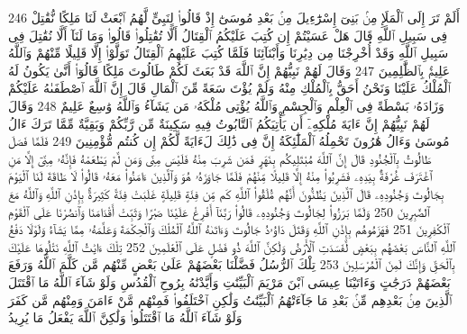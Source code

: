 {\tiny\colorbox{cl_aya}{246}} أَلَمْ تَرَ إِلَى ٱلْمَلَإِ مِنۢ بَنِىٓ إِسْرَٰٓءِيلَ مِنۢ بَعْدِ مُوسَىٰٓ إِذْ قَالُوا۟ لِنَبِىٍّ لَّهُمُ ٱبْعَثْ لَنَا مَلِكًا نُّقَٰتِلْ فِى سَبِيلِ ٱللَّهِ قَالَ هَلْ عَسَيْتُمْ إِن كُتِبَ عَلَيْكُمُ ٱلْقِتَالُ أَلَّا تُقَٰتِلُوا۟ قَالُوا۟ وَمَا لَنَآ أَلَّا نُقَٰتِلَ فِى سَبِيلِ ٱللَّهِ وَقَدْ أُخْرِجْنَا مِن دِيَٰرِنَا وَأَبْنَآئِنَا فَلَمَّا كُتِبَ عَلَيْهِمُ ٱلْقِتَالُ تَوَلَّوْا۟ إِلَّا قَلِيلًا مِّنْهُمْ وَٱللَّهُ عَلِيمٌۢ بِٱلظَّٰلِمِينَ
{\tiny\colorbox{cl_aya}{247}} وَقَالَ لَهُمْ نَبِيُّهُمْ إِنَّ ٱللَّهَ قَدْ بَعَثَ لَكُمْ طَالُوتَ مَلِكًا قَالُوٓا۟ أَنَّىٰ يَكُونُ لَهُ ٱلْمُلْكُ عَلَيْنَا وَنَحْنُ أَحَقُّ بِٱلْمُلْكِ مِنْهُ وَلَمْ يُؤْتَ سَعَةً مِّنَ ٱلْمَالِ قَالَ إِنَّ ٱللَّهَ ٱصْطَفَىٰهُ عَلَيْكُمْ وَزَادَهُۥ بَسْطَةً فِى ٱلْعِلْمِ وَٱلْجِسْمِ وَٱللَّهُ يُؤْتِى مُلْكَهُۥ مَن يَشَآءُ وَٱللَّهُ وَٰسِعٌ عَلِيمٌ
{\tiny\colorbox{cl_aya}{248}} وَقَالَ لَهُمْ نَبِيُّهُمْ إِنَّ ءَايَةَ مُلْكِهِۦٓ أَن يَأْتِيَكُمُ ٱلتَّابُوتُ فِيهِ سَكِينَةٌ مِّن رَّبِّكُمْ وَبَقِيَّةٌ مِّمَّا تَرَكَ ءَالُ مُوسَىٰ وَءَالُ هَٰرُونَ تَحْمِلُهُ ٱلْمَلَٰٓئِكَةُ إِنَّ فِى ذَٰلِكَ لَءَايَةً لَّكُمْ إِن كُنتُم مُّؤْمِنِينَ
{\tiny\colorbox{cl_aya}{249}} فَلَمَّا فَصَلَ طَالُوتُ بِٱلْجُنُودِ قَالَ إِنَّ ٱللَّهَ مُبْتَلِيكُم بِنَهَرٍ فَمَن شَرِبَ مِنْهُ فَلَيْسَ مِنِّى وَمَن لَّمْ يَطْعَمْهُ فَإِنَّهُۥ مِنِّىٓ إِلَّا مَنِ ٱغْتَرَفَ غُرْفَةًۢ بِيَدِهِۦ فَشَرِبُوا۟ مِنْهُ إِلَّا قَلِيلًا مِّنْهُمْ فَلَمَّا جَاوَزَهُۥ هُوَ وَٱلَّذِينَ ءَامَنُوا۟ مَعَهُۥ قَالُوا۟ لَا طَاقَةَ لَنَا ٱلْيَوْمَ بِجَالُوتَ وَجُنُودِهِۦ قَالَ ٱلَّذِينَ يَظُنُّونَ أَنَّهُم مُّلَٰقُوا۟ ٱللَّهِ كَم مِّن فِئَةٍ قَلِيلَةٍ غَلَبَتْ فِئَةً كَثِيرَةًۢ بِإِذْنِ ٱللَّهِ وَٱللَّهُ مَعَ ٱلصَّٰبِرِينَ
{\tiny\colorbox{cl_aya}{250}} وَلَمَّا بَرَزُوا۟ لِجَالُوتَ وَجُنُودِهِۦ قَالُوا۟ رَبَّنَآ أَفْرِغْ عَلَيْنَا صَبْرًا وَثَبِّتْ أَقْدَامَنَا وَٱنصُرْنَا عَلَى ٱلْقَوْمِ ٱلْكَٰفِرِينَ
{\tiny\colorbox{cl_aya}{251}} فَهَزَمُوهُم بِإِذْنِ ٱللَّهِ وَقَتَلَ دَاوُۥدُ جَالُوتَ وَءَاتَىٰهُ ٱللَّهُ ٱلْمُلْكَ وَٱلْحِكْمَةَ وَعَلَّمَهُۥ مِمَّا يَشَآءُ وَلَوْلَا دَفْعُ ٱللَّهِ ٱلنَّاسَ بَعْضَهُم بِبَعْضٍ لَّفَسَدَتِ ٱلْأَرْضُ وَلَٰكِنَّ ٱللَّهَ ذُو فَضْلٍ عَلَى ٱلْعَٰلَمِينَ
{\tiny\colorbox{cl_aya}{252}} تِلْكَ ءَايَٰتُ ٱللَّهِ نَتْلُوهَا عَلَيْكَ بِٱلْحَقِّ وَإِنَّكَ لَمِنَ ٱلْمُرْسَلِينَ
{\tiny\colorbox{cl_aya}{253}} تِلْكَ ٱلرُّسُلُ فَضَّلْنَا بَعْضَهُمْ عَلَىٰ بَعْضٍ مِّنْهُم مَّن كَلَّمَ ٱللَّهُ وَرَفَعَ بَعْضَهُمْ دَرَجَٰتٍ وَءَاتَيْنَا عِيسَى ٱبْنَ مَرْيَمَ ٱلْبَيِّنَٰتِ وَأَيَّدْنَٰهُ بِرُوحِ ٱلْقُدُسِ وَلَوْ شَآءَ ٱللَّهُ مَا ٱقْتَتَلَ ٱلَّذِينَ مِنۢ بَعْدِهِم مِّنۢ بَعْدِ مَا جَآءَتْهُمُ ٱلْبَيِّنَٰتُ وَلَٰكِنِ ٱخْتَلَفُوا۟ فَمِنْهُم مَّنْ ءَامَنَ وَمِنْهُم مَّن كَفَرَ وَلَوْ شَآءَ ٱللَّهُ مَا ٱقْتَتَلُوا۟ وَلَٰكِنَّ ٱللَّهَ يَفْعَلُ مَا يُرِيدُ
